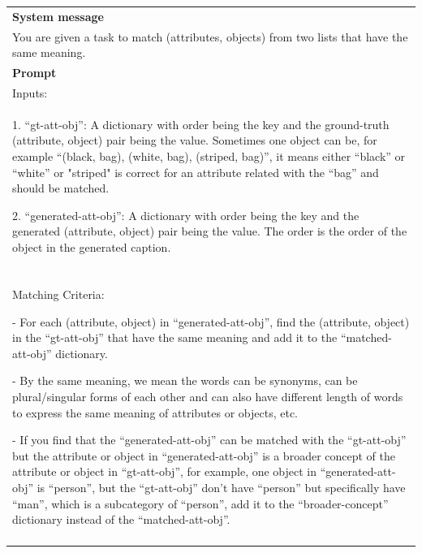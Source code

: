 \begin{table}[h!]\centering
\begin{minipage}{0.95\textwidth}  
\centering
\begin{tcolorbox} 
    \centering
      \small
    \begin{tabular}{p{}}
   { {\bf System message} } \\
You are given a task to match (attributes, objects) from two lists that have the same meaning. \\
    \midrule
    {\bf Prompt}  \\
        
        Inputs:\\
        
        1. ``gt-att-obj'': A dictionary with order being the key and the ground-truth (attribute, object) pair being the value. Sometimes one object can be, for example ``(black, bag), (white, bag), (striped, bag)'', it means either ``black'' or ``white'' or "striped" is correct for an attribute related with the ``bag'' and should be matched. 
        
        2. ``generated-att-obj'': A dictionary with order being the key and the generated (attribute, object) pair being the value. The order is the order of the object in the generated caption. \\\\

        Matching Criteria:
        
        - For each (attribute, object) in ``generated-att-obj'', find the (attribute, object) in the ``gt-att-obj'' that have the same meaning and add it to the ``matched-att-obj'' dictionary.
        
        - By the same meaning, we mean the words can be synonyms, can be plural/singular forms of each other and can also have different length of words to express the same meaning of attributes or objects, etc. 
        
        - If you find that the ``generated-att-obj'' can be matched with the ``gt-att-obj'' but the attribute or object in ``generated-att-obj'' is a broader concept of the attribute or object in ``gt-att-obj'', for example, one object in ``generated-att-obj'' is ``person'', but the ``gt-att-obj'' don't have ``person'' but specifically have ``man'', which is a subcategory of ``person'', add it to the ``broader-concept'' dictionary instead of the ``matched-att-obj''.\\\\
        

\end{tabular}
\end{tcolorbox}
\end{minipage}
\end{table}
